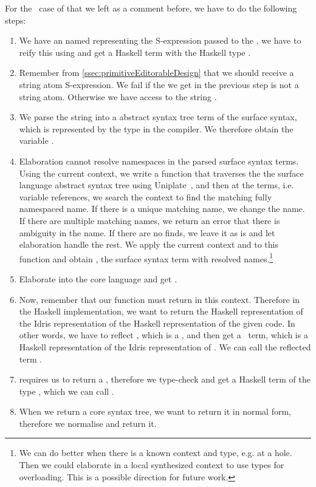 For the \TT\ case of  that we left as a comment before, we have to do the following steps:
\begin{enumerate}
  \item We have an  named  representing the S-expression passed to
    the , we have to reify this using  and
    get a Haskell term with the Haskell type .
  \item Remember from \autoref{ssec:primitiveEditorableDesign} that we should
    receive a string atom S-expression. We fail if the  we get in the
    previous step is not a string atom. Otherwise we have access to the string
    .
  \item We parse the string  into a abstract syntax tree term  of
    the surface syntax, which is represented by the type  in the
    compiler. We therefore obtain the variable .
  \item Elaboration cannot resolve namespaces in the parsed surface syntax
    terms.  Using the current context, we write a function
    that traverses the the surface language abstract syntax tree using
    Uniplate~\cite{uniplate}, and then at the  terms, i.e. variable
    references, we search the context to find the matching fully namespaced
    name. If there is a unique matching name, we change the name. If there are multiple
    matching names, we return an error that there is ambiguity in the name. If there are
    no finds, we leave it as is and let elaboration handle the rest.
    We apply the current context and  to this function and obtain
    , the surface syntax term with resolved names.\footnote{
     We can do better when there is a known context and type, e.g. at a hole.
     Then we could elaborate in a local synthesized context to use types for
     overloading. This is a possible direction for future work.}
  \item Elaborate  into the core language and get .
  \item Now, remember that our function  must return
     in this context. Therefore in the Haskell implementation, we
    want to return the Haskell representation of the Idris representation of
    the Haskell representation of the given code. In other words, we have to
    reflect , which is a , and then get a \Raw\ term, which
    is a Haskell representation of the Idris representation of .
    We can call the reflected term .
  \item {} requires us to return a , therefore we
    type-check  and get a Haskell term of the type ,
    which we can call .
  \item When we return a core syntax tree, we want to return it in normal form,
    therefore we normalise  and return it.
\end{enumerate}

